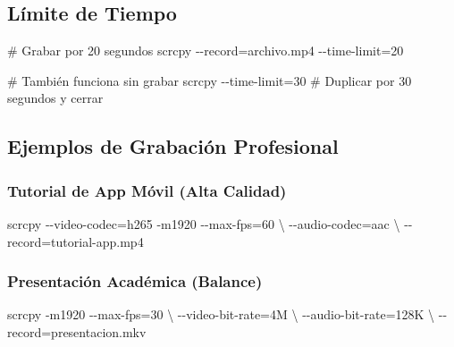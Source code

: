 \documentclass[
  doc,
  floatsintext,
  longtable,
  a4paper,
  nolmodern,
  notxfonts,
  notimes,
  12pt,
  colorlinks=true,linkcolor=blue,citecolor=blue,urlcolor=blue]{apa7}
\newenvironment{Shaded}{\begin{snugshade}}{\end{snugshade}}
\newcommand{\AttributeTok}[1]{\textcolor[rgb]{0.40,0.45,0.13}{#1}}
\newcommand{\CommentTok}[1]{\textcolor[rgb]{0.37,0.37,0.37}{#1}}
\newcommand{\DataTypeTok}[1]{\textcolor[rgb]{0.68,0.00,0.00}{#1}}
\newcommand{\ExtensionTok}[1]{\textcolor[rgb]{0.00,0.23,0.31}{#1}}
\newcommand{\NormalTok}[1]{\textcolor[rgb]{0.00,0.23,0.31}{#1}}
\newcommand{\OperatorTok}[1]{\textcolor[rgb]{0.37,0.37,0.37}{#1}}
\begin{document}
\subsection{Límite de Tiempo}\label{luxedmite-de-tiempo}

\begin{Shaded}
\begin{Highlighting}[]
\CommentTok{\# Grabar por 20 segundos}
\ExtensionTok{scrcpy} \AttributeTok{{-}{-}record}\OperatorTok{=}\NormalTok{archivo.mp4 }\AttributeTok{{-}{-}time{-}limit}\OperatorTok{=}\NormalTok{20}

\CommentTok{\# También funciona sin grabar}
\ExtensionTok{scrcpy} \AttributeTok{{-}{-}time{-}limit}\OperatorTok{=}\NormalTok{30  }\CommentTok{\# Duplicar por 30 segundos y cerrar}
\end{Highlighting}
\end{Shaded}

\subsection{Ejemplos de Grabación
Profesional}\label{ejemplos-de-grabaciuxf3n-profesional}

\subsubsection{Tutorial de App Móvil (Alta
Calidad)}\label{tutorial-de-app-muxf3vil-alta-calidad}

\begin{Shaded}
\begin{Highlighting}[]
\ExtensionTok{scrcpy} \AttributeTok{{-}{-}video{-}codec}\OperatorTok{=}\NormalTok{h265 }\AttributeTok{{-}m1920} \AttributeTok{{-}{-}max{-}fps}\OperatorTok{=}\NormalTok{60 }\DataTypeTok{\textbackslash{}}
  \AttributeTok{{-}{-}audio{-}codec}\OperatorTok{=}\NormalTok{aac }\DataTypeTok{\textbackslash{}}
  \AttributeTok{{-}{-}record}\OperatorTok{=}\NormalTok{tutorial{-}app.mp4}
\end{Highlighting}
\end{Shaded}

\subsubsection{Presentación Académica
(Balance)}\label{presentaciuxf3n-acaduxe9mica-balance}

\begin{Shaded}
\begin{Highlighting}[]
\ExtensionTok{scrcpy} \AttributeTok{{-}m1920} \AttributeTok{{-}{-}max{-}fps}\OperatorTok{=}\NormalTok{30 }\DataTypeTok{\textbackslash{}}
  \AttributeTok{{-}{-}video{-}bit{-}rate}\OperatorTok{=}\NormalTok{4M }\DataTypeTok{\textbackslash{}}
  \AttributeTok{{-}{-}audio{-}bit{-}rate}\OperatorTok{=}\NormalTok{128K }\DataTypeTok{\textbackslash{}}
  \AttributeTok{{-}{-}record}\OperatorTok{=}\NormalTok{presentacion.mkv}
\end{Highlighting}
\end{Shaded}
\end{document}
